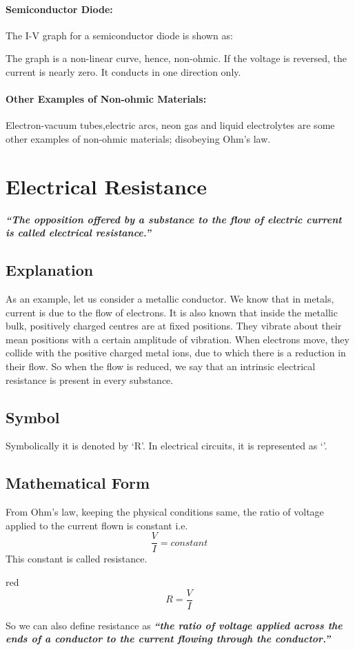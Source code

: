 \paragraph{Semiconductor Diode:}
The I-V graph for a semiconductor diode is shown as:

The graph is a non-linear curve, hence, non-ohmic. If the voltage is reversed, the current is nearly zero. It conducts in one direction only.

\paragraph{Other Examples of Non-ohmic Materials:}
Electron-vacuum tubes,electric arcs, neon gas and liquid electrolytes are some other examples of non-ohmic materials; disobeying Ohm’s law.
\section{Electrical Resistance}
\textit{\textbf{``The opposition offered by a substance to the flow of electric current is called electrical resistance.”}}
\subsection*{Explanation}
As an example, let us consider a metallic conductor. We know that in metals, current is due to the flow of electrons. It is also known that inside the metallic bulk, positively charged centres are at fixed positions. They vibrate about their mean positions with a certain amplitude of vibration. When electrons move, they collide with the positive charged metal ions, due to which there is a reduction in their flow. So when the flow is reduced, we say that an intrinsic electrical resistance is present in every substance.
\subsection*{Symbol}
Symbolically it is denoted by ‘R’. In electrical circuits, it is represented as
`\resistor{}'.
\subsection*{Mathematical Form}
From Ohm’s law, keeping the physical conditions same, the ratio of voltage applied to the current flown is constant i.e.
\begin{equation}\nonumber
\frac{V}{I} = constant
\end{equation}
This constant is called resistance.
\begin{mybox}{red}{}
\begin{equation}\label{eq:12.6}
    R = \frac{V}{I}
 \end{equation}
\end{mybox}
\noindent So we can also define resistance as 
\textit{\textbf{``the ratio of voltage applied across the ends of a conductor to the current flowing through the conductor.”}}
